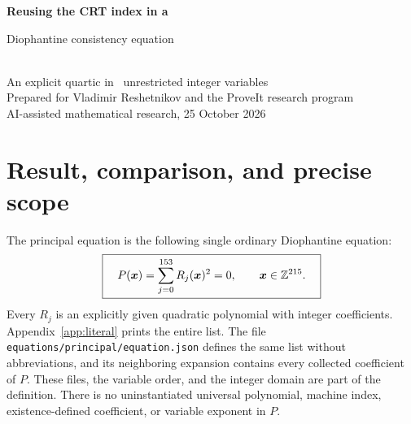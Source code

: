 \documentclass[11pt]{article}
\theoremstyle{definition}\newtheorem{remark}[theorem]{Remark}
\newcommand{\Z}{\mathbb Z}\newcommand{\N}{\mathbb N}\newcommand{\Q}{\mathbb Q}
\begin{document}
\begin{center}
{\LARGE\bfseries Reusing the CRT index in a\par Diophantine consistency equation}\\[9pt]
{\large An explicit quartic in \NV\ unrestricted integer variables}\\[10pt]
Prepared for Vladimir Reshetnikov and the ProveIt research program\\
AI-assisted mathematical research, 25 October 2026
\end{center}

\begin{abstract}
We construct an explicitly specified polynomial $P\in\Z[x_0,\ldots,x_{\LastVar}]$
of degree four such that ZFC proves that $P$ has no integer zero if and only
if ZFC is syntactically consistent. The polynomial is the sum of
\NR\ squares of quadratic polynomials, printed in the appendix and supplied
as exact coefficient data. Its collected expansion has \NT\ nonzero
monomials and coefficient height \Height.

The new arithmetic step eliminates a derived-formula-size test. The
independent CRT row-index representative already has a Pell pair and can
be chosen even and arbitrarily large in its residue class. It therefore
also supplies the semantic index bound used by the shared Pell certificate.
The removed size test is compensated by a larger label-weight parameter,
certified with a polynomially constructed exponent. A sharp elementary
product-separation lemma proves that this change preserves proof decoding.
Five exact quadratic projections and one additional affine projection
reduce the arithmetic source from 221 to 215 coordinates. Reversible
coordinate and row changes then reduce its coefficient height as well
as its number of monomials. The resulting 215-variable quartic is the
principal equation. The construction uses the numerical $C_{222}$ calculus directly.
The inherited logical calibration is identified explicitly; no new
end-to-end Lean or Rocq formalization is claimed.
\end{abstract}

\section{Result, comparison, and precise scope}

The principal equation is the following single ordinary Diophantine equation:
\begin{equation}\label{eq:main}
\boxed{\quad P(\boldsymbol x)=\sum_{j=0}^{\LastRow}R_j(\boldsymbol x)^2=0,
\qquad \boldsymbol x\in\Z^{\NV}.\quad}
\end{equation}
Every $R_j$ is an explicitly given quadratic polynomial with integer
coefficients. Appendix~\ref{app:literal} prints the entire list. The file
\nolinkurl{equations/principal/equation.json} defines the same list without
abbreviations, and its neighboring expansion contains every collected
coefficient of $P$. These files, the variable order, and the integer domain
are part of the definition. There is no uninstantiated universal polynomial,
machine index, existence-defined coefficient, or variable exponent in $P$.
\end{document}
